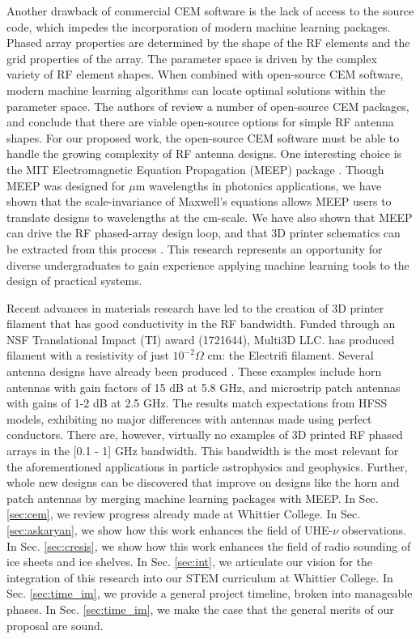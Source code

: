 \documentclass[../../main.tex]{subfiles}
\begin{document}
Another drawback of commercial CEM software is the lack of access to the source code, which impedes the incorporation of modern machine learning packages.  Phased array properties are determined by the shape of the RF elements and the grid properties of the array.  The parameter space is driven by the complex variety of RF element shapes.  When combined with open-source CEM software, modern machine learning algorithms can locate optimal solutions within the parameter space.  The authors of \cite{10.3390/electronics8121506} review a number of open-source CEM packages, and conclude that there are viable open-source options for simple RF antenna shapes.  For our proposed work, the open-source CEM software must be able to handle the growing complexity of RF antenna designs.  One interesting choice is the MIT Electromagnetic Equation Propagation (MEEP) package \cite{10.1016/j.cpc.2009.11.008}.  Though MEEP was designed for $\mu$m wavelengths in photonics applications, we have shown that the scale-invariance of Maxwell's equations allows MEEP users to translate designs to wavelengths at the cm-scale.  We have also shown that MEEP can drive the RF phased-array design loop, and that 3D printer schematics can be extracted from this process \cite{electronics10040415,meepcon2022,10.1016/j.cpc.2009.11.008}.  This research represents an opportunity for diverse undergraduates to gain experience applying machine learning tools to the design of practical systems.  \\ \vspace{2.5mm}

Recent advances in materials research have led to the creation of 3D printer filament that has good conductivity in the RF bandwidth.  Funded through an NSF Translational Impact (TI) award (1721644), Multi3D LLC. has produced filament with a resistivity of just $10^{-2} \Omega$ cm: the Electrifi filament.  Several antenna designs have already been produced \cite{8786183,10.1049/iet-map.2017.0104}.  These examples include horn antennas with gain factors of 15 dB at 5.8 GHz, and microstrip patch antennas with gains of 1-2 dB at 2.5 GHz.  The results match expectations from HFSS models, exhibiting no major differences with antennas made using perfect conductors.  There are, however, virtually no examples of 3D printed RF phased arrays in the [0.1 - 1] GHz bandwidth.  This bandwidth is the most relevant for the aforementioned applications in particle astrophysics and geophysics.  Further, whole new designs can be discovered that improve on designs like the horn and patch antennas by merging machine learning packages with MEEP.  In Sec. \ref{sec:cem}, we review progress already made at Whittier College.  In Sec. \ref{sec:askaryan}, we show how this work enhances the field of UHE-$\nu$ observations.  In Sec. \ref{sec:cresis}, we show how this work enhances the field of radio sounding of ice sheets and ice shelves.  In Sec. \ref{sec:int}, we articulate our vision for the integration of this research into our STEM curriculum at Whittier College.  In Sec. \ref{sec:time_im}, we provide a general project timeline, broken into manageable phases.  In Sec. \ref{sec:time_im}, we make the case that the general merits of our proposal are sound.
\end{document}
